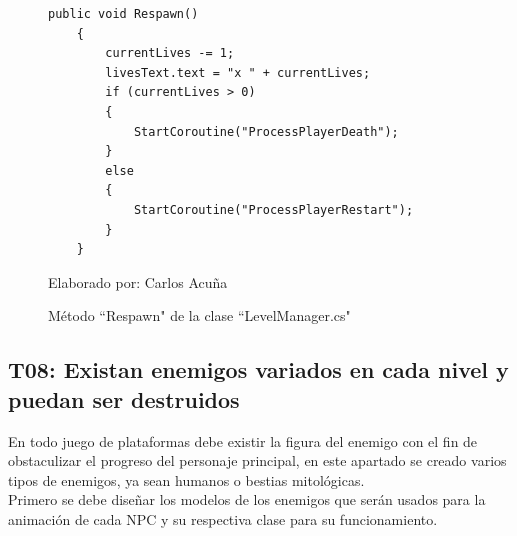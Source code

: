 \documentclass[a4paper, openright, 12pt]{report}
\begin{document}
\begin{itemize}
\begin{figure}[h]
\captionsetup{justification=centering,margin=2cm}
\centering
\lstset{language=C, breaklines=true, basicstyle=\footnotesize}
\lstset{numbers=left, numberstyle=\tiny, stepnumber=1, numbersep=-2pt}
\captionsetup{justification=centering,margin=2cm}
\begin{lstlisting}[frame=single]
  public void Respawn()
    {
        currentLives -= 1;
        livesText.text = "x " + currentLives;
        if (currentLives > 0)
        {
            StartCoroutine("ProcessPlayerDeath");
        }
        else
        {
            StartCoroutine("ProcessPlayerRestart");
        }
    }
\end{lstlisting}
\caption{Método ``Respawn" de la clase ``LevelManager.cs"}
Elaborado por: Carlos Acuña
\end{figure}

\end{itemize}
\clearpage
\subsection*{T08: Existan enemigos variados en cada nivel y puedan ser destruidos}
\justify
En todo juego de plataformas debe existir la figura del enemigo con el fin de obstaculizar el progreso del personaje principal, en este apartado se creado varios tipos de enemigos, ya sean humanos o bestias mitológicas.\\
Primero se debe diseñar los modelos de los enemigos que serán usados para la animación de cada NPC y su respectiva clase para su funcionamiento.
\end{document}

